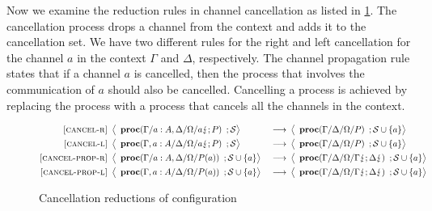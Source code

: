 \documentclass[12pt, openany]{memoir}
\newcommand*{\cancel}[1]{#1 \lightning}
\newcommand*{\procObj}[4]{\textbf{proc}(#1/#2/#3/#4)}
\newcommand*{\cancelSet}[0]{\mathcal{S}}
\begin{document}
Now we examine the reduction rules in channel cancellation as listed in \cref{fig:cancelreduction}.
The cancellation process drops a channel from the context and adds it to the cancellation set.
We have two different rules for the right and left cancellation for the channel $a$ in the context $\Gamma$ and $\Delta$, respectively.
The channel propagation rule states that if a channel $a$ is cancelled, then the process that involves the communication of $a$ should also be cancelled.
Cancelling a process is achieved by replacing the process with a process that cancels all the channels in the context. 
\begin{figure}[H]
  \begin{alignat}{4}
    \label{cancelR} \textsc{[cancel-r]} & ~ 
    \Braket{
      \begin{array}{l}
        \procObj{\Gamma}{a : A, \Delta}{\Omega}{\cancel{a}; P}
      \end{array}
      ; \cancelSet
    } & ~ \longrightarrow & ~ 
    \Braket{
      \begin{array}{l}
        \procObj{\Gamma}{\Delta}{\Omega}{P}
      \end{array}
      ; \cancelSet \cup \{a\}
    } \tag*{} \\
    \label{cancelL} \textsc{[cancel-l]} & ~ 
    \Braket{
      \begin{array}{l}
        \procObj{\Gamma, a : A}{\Delta}{\Omega}{\cancel{a}; P}
      \end{array}
      ; \cancelSet
    } & ~ \longrightarrow & ~ 
    \Braket{
      \begin{array}{l}
        \procObj{\Gamma}{\Delta}{\Omega}{P}
      \end{array}
      ; \cancelSet \cup \{a\}
    } \tag*{} \\
    \label{cancel-prop-r} \textsc{[cancel-prop-r]} & ~ 
    \Braket{
      \begin{array}{l}
        \procObj{\Gamma}{a : A, \Delta}{\Omega}{P(a)}
      \end{array}
      ; \cancelSet \cup \{a\}
    } & ~ \longrightarrow & ~ 
    \Braket{
      \begin{array}{l}
        \procObj{\Gamma}{\Delta}{\Omega}{\cancel{\Gamma}; \cancel{\Delta}}
      \end{array}
      ; \cancelSet \cup \{a\}
    } \tag*{} \\
    \label{cancel-prop-l} \textsc{[cancel-prop-l]} & ~ 
    \Braket{
      \begin{array}{l}
        \procObj{\Gamma, a : A}{\Delta}{\Omega}{P(a)}
      \end{array}
      ; \cancelSet \cup \{a\}
    } & ~ \longrightarrow & ~ 
    \Braket{
      \begin{array}{l}
        \procObj{\Gamma}{\Delta}{\Omega}{\cancel{\Gamma}; \cancel{\Delta}}
      \end{array}
      ; \cancelSet \cup \{a\}
    } \tag*{}
  \end{alignat}
  \raggedleft
  \caption{Cancellation reductions of configuration}
  \label{fig:cancelreduction}
\end{figure}
\end{document}
